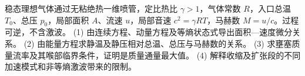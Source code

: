 稳态理想气体通过无粘绝热一维喷管，定比热比 \(\gamma>1\)，气体常数 \(R\)，入口总温 \(T_0\)、总压 \(p_0\)，局部面积 \(A\)、流速 \(u\)，局部音速 \(c^2=\gamma RT\)，马赫数 \(M=u/c\)。过程可逆，不含激波。
(1) 由连续方程、动量方程及等熵状态式导出面积—速度微分关系。
(2) 由能量方程求静温及静压相对总温、总压与马赫数的关系。
(3) 求壅塞质量流率及其喉部临界条件，证明是质量通量最大值。
(4) 解释收缩及扩张段的不同加速模式和非等熵激波带来的限制。
